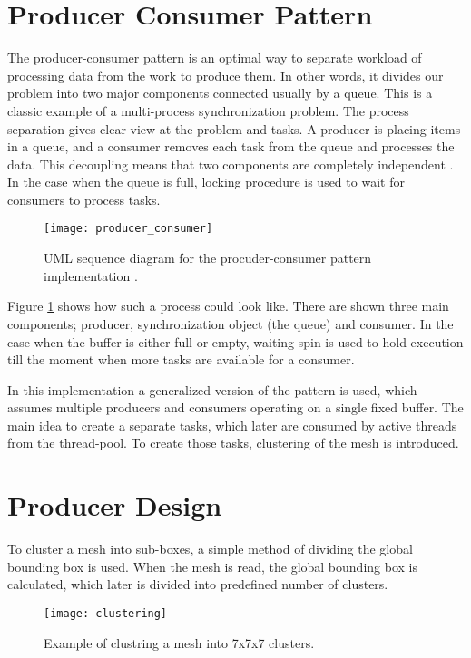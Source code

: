 \section{Producer Consumer Pattern}

The producer-consumer pattern is an optimal way to separate workload of processing data from the work to produce them. In other words, it divides our problem into two major components connected usually by a queue. This is a classic example of a multi-process synchronization problem. The process separation gives clear view at the problem and tasks. A producer is placing items in a queue, and a consumer removes each task from the queue and processes the data. This decoupling means that two components are completely independent \cite{grand02}. In the case when the queue is full, locking procedure is used to wait for consumers to process tasks.

\begin{figure}[H]
  \begin{center}
    \texttt{[image: producer\_consumer]}
    \caption{UML sequence diagram for the procuder-consumer pattern implementation \cite{ropero17}.}
    \label{fig:uml}
  \end{center}
\end{figure}

Figure \ref{fig:uml} shows how such a process could look like. There are shown three main components; producer, synchronization object (the queue) and consumer. In the case when the buffer is either full or empty, waiting spin is used to hold execution till the moment when more tasks are available for a consumer.

In this implementation a generalized version of the pattern is used, which assumes multiple producers and consumers operating on a single fixed buffer. The main idea to create a separate tasks, which later are consumed by active threads from the thread-pool. To create those tasks, clustering of the mesh is introduced.

\newpage
\section{Producer Design}

To cluster a mesh into sub-boxes, a simple method of dividing the global bounding box is used. When the mesh is read, the global bounding box is calculated, which later is divided into predefined number of clusters.

\begin{figure}[H]
  \begin{center}
    \texttt{[image: clustering]}
    \caption{Example of clustring a mesh into 7x7x7 clusters.}
    \label{fig:clustering}
  \end{center}
\end{figure}

